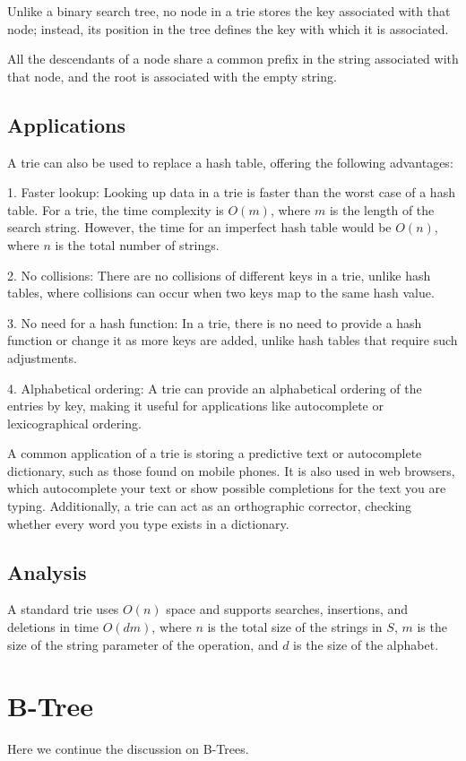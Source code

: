 Unlike a binary search tree, no node in a trie stores the key associated with that node; instead, its position in the tree defines the key with which it is associated. 

All the descendants of a node share a common prefix in the string associated with that node, and the root is associated with the empty string.

\subsection{Applications}
A trie can also be used to replace a hash table, offering the following advantages:

1. Faster lookup: Looking up data in a trie is faster than the worst case of a hash table. For a trie, the time complexity is \(O(m)\), where \(m\) is the length of the search string. However, the time for an imperfect hash table would be \(O(n)\), where \(n\) is the total number of strings.

2. No collisions: There are no collisions of different keys in a trie, unlike hash tables, where collisions can occur when two keys map to the same hash value.

3. No need for a hash function: In a trie, there is no need to provide a hash function or change it as more keys are added, unlike hash tables that require such adjustments.

4. Alphabetical ordering: A trie can provide an alphabetical ordering of the entries by key, making it useful for applications like autocomplete or lexicographical ordering.

A common application of a trie is storing a predictive text or autocomplete dictionary, such as those found on mobile phones. It is also used in web browsers, which autocomplete your text or show possible completions for the text you are typing. Additionally, a trie can act as an orthographic corrector, checking whether every word you type exists in a dictionary.

\subsection{Analysis}
A standard trie uses \(O(n)\) space and supports searches, insertions, and deletions in time \(O(dm)\), where \(n\) is the total size of the strings in \(S\), \(m\) is the size of the string parameter of the operation, and \(d\) is the size of the alphabet.

\section{B-Tree}
Here we continue the discussion on B-Trees.  


